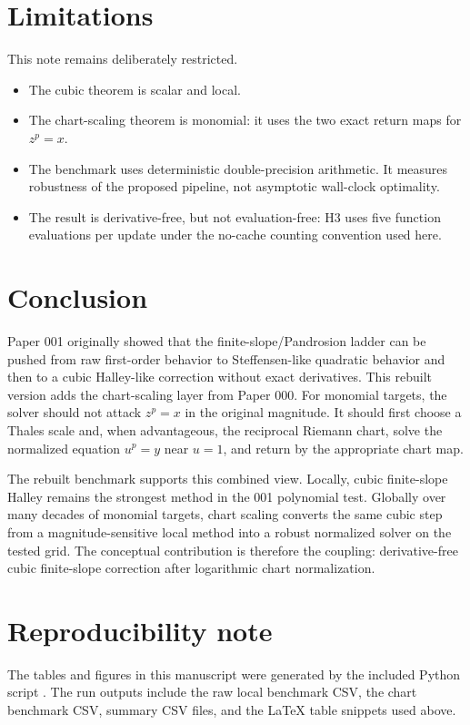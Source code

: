 \documentclass[11pt]{article}
\begin{document}
\section{Limitations}
This note remains deliberately restricted.
\begin{itemize}[leftmargin=2.2em]
\item The cubic theorem is scalar and local.
\item The chart-scaling theorem is monomial: it uses the two exact return maps for $z^p=x$.
\item The benchmark uses deterministic double-precision arithmetic.  It measures robustness of the proposed pipeline, not asymptotic wall-clock optimality.
\item The result is derivative-free, but not evaluation-free: H3 uses five function evaluations per update under the no-cache counting convention used here.
\end{itemize}

\section{Conclusion}
Paper 001 originally showed that the finite-slope/Pandrosion ladder can be pushed from raw first-order behavior to Steffensen-like quadratic behavior and then to a cubic Halley-like correction without exact derivatives.  This rebuilt version adds the chart-scaling layer from Paper 000.  For monomial targets, the solver should not attack $z^p=x$ in the original magnitude.  It should first choose a Thales scale and, when advantageous, the reciprocal Riemann chart, solve the normalized equation $u^p=y$ near $u=1$, and return by the appropriate chart map.

The rebuilt benchmark supports this combined view.  Locally, cubic finite-slope Halley remains the strongest method in the 001 polynomial test.  Globally over many decades of monomial targets, chart scaling converts the same cubic step from a magnitude-sensitive local method into a robust normalized solver on the tested grid.  The conceptual contribution is therefore the coupling: derivative-free cubic finite-slope correction after logarithmic chart normalization.

\section*{Reproducibility note}
The tables and figures in this manuscript were generated by the included Python script .  The run outputs include the raw local benchmark CSV, the chart benchmark CSV, summary CSV files, and the LaTeX table snippets used above.
\end{document}
